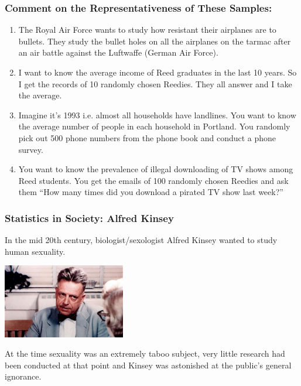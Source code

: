 \documentclass[handout]{beamer}
\begin{document}
\begin{frame}
\frametitle{Comment on the Representativeness of These Samples:}

\begin{small}
\begin{enumerate}
\item The Royal Air Force wants to study how resistant their airplanes are to bullets. They study the bullet holes on all the airplanes on the tarmac after an air battle against the Luftwaffe (German Air Force).
\item I want to know the average income of Reed graduates in the last 10 years.  So I get the records of 10 randomly chosen Reedies.  They all answer and I take the average.
\item Imagine it's 1993 i.e. almost all households have landlines.  You want to know the average number of people in each household in Portland.  You randomly pick out 500 phone numbers from the phone book and conduct a phone survey.
\item You want to know the prevalence of illegal downloading of TV shows among Reed students.  You get the emails of 100 randomly chosen Reedies and ask them ``How many times did you download a pirated TV show last week?''
\end{enumerate}
\end{small}

\end{frame}




\begin{frame}
\frametitle{Statistics in Society: Alfred Kinsey}
In the mid 20th century, biologist/sexologist Alfred Kinsey wanted to study human sexuality.  

\begin{center}
\includegraphics[width=0.4\textwidth]{./figure/alfred-kinsey.jpg}
\end{center}

\pause At the time sexuality was an extremely taboo subject, very little research had been conducted at that point and Kinsey was astonished at the public's general ignorance.  

\end{frame}
\end{document}
